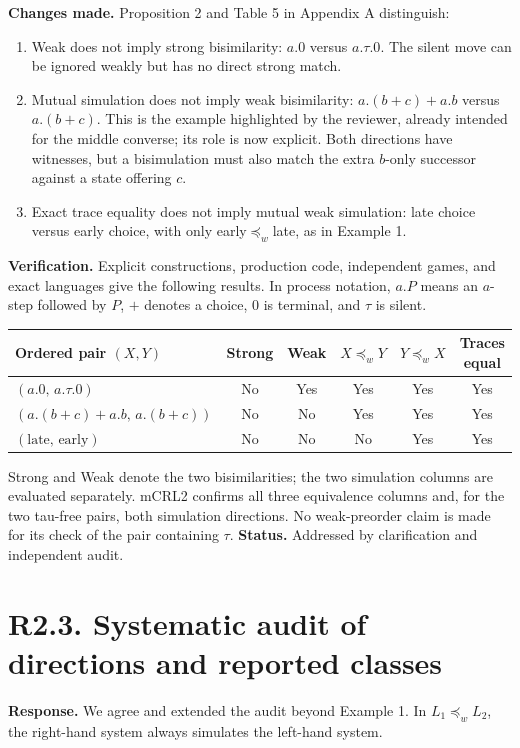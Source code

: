 \documentclass[11pt]{article}
\newcommand{\prew}{\mathrel{\preceq_w}}
\begin{document}
\textbf{Changes made.} Proposition 2 and Table 5 in Appendix A distinguish:
\begin{enumerate}
\item Weak does not imply strong bisimilarity: $a.0$ versus $a.\tau.0$.
The silent move can be ignored weakly but has no direct strong match.
\item Mutual simulation does not imply weak bisimilarity:
$a.(b+c)+a.b$ versus $a.(b+c)$. This is the example highlighted by the reviewer,
already intended for the middle converse; its role is now explicit. Both
directions have witnesses, but a bisimulation must also match the extra
$b$-only successor against a state offering $c$.
\item Exact trace equality does not imply mutual weak simulation:
late choice versus early choice, with only early$\prew$late, as in Example 1.
\end{enumerate}
\textbf{Verification.} Explicit constructions, production code, independent
games, and exact languages give the following results. In process notation,
$a.P$ means an $a$-step followed by $P$, $+$ denotes a choice, $0$ is terminal,
and $\tau$ is silent.
\begin{center}
\small
\begin{tabular}{@{}lccccc@{}}
\toprule
Ordered pair $(X,Y)$ & Strong & Weak & $X\prew Y$ & $Y\prew X$ & Traces equal \\
\midrule
$(a.0,\,a.\tau.0)$ & No & Yes & Yes & Yes & Yes \\
$(a.(b+c)+a.b,\,a.(b+c))$ & No & No & Yes & Yes & Yes \\
$(\mathrm{late},\,\mathrm{early})$ & No & No & No & Yes & Yes \\
\bottomrule
\end{tabular}
\end{center}
Strong and Weak denote the two bisimilarities; the two simulation columns
are evaluated separately. mCRL2 confirms all three equivalence columns
and, for the two tau-free pairs, both simulation directions. No weak-preorder
claim is made for its check of the pair containing $\tau$.
\textbf{Status.} Addressed by clarification and independent audit.

\section*{R2.3. Systematic audit of directions and reported classes}
\textbf{Response.} We agree and extended the audit beyond Example 1.
In $L_1\prew L_2$, the right-hand system always simulates the left-hand system.
\end{document}
